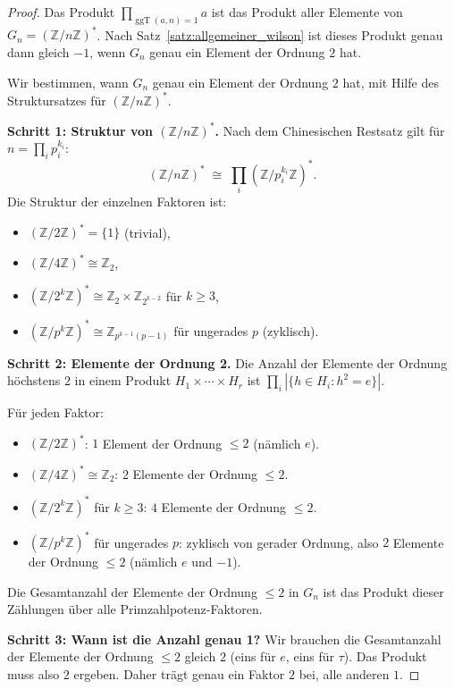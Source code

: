 \documentclass[12pt,a4paper]{amsart}
\theoremstyle{definition}
\newcommand{\Z}{\mathbb{Z}}
\DeclareMathOperator{\ggT}{ggT}
\begin{document}
\begin{proof}
  Das Produkt $\prod_{\ggT(a,n)=1} a$ ist das Produkt aller Elemente von
  $G_n = (\Z/n\Z)^*$. Nach Satz~\ref{satz:allgemeiner_wilson} ist dieses
  Produkt genau dann gleich $-1$, wenn $G_n$ genau ein Element der Ordnung $2$ hat.

  Wir bestimmen, wann $G_n$ genau ein Element der Ordnung $2$ hat, mit Hilfe des
  Struktursatzes für $(\Z/n\Z)^*$.

  \textbf{Schritt 1: Struktur von $(\Z/n\Z)^*$.}
  Nach dem Chinesischen Restsatz gilt für $n = \prod_{i} p_i^{k_i}$:
  \[
    (\Z/n\Z)^* \;\cong\; \prod_i (\Z/p_i^{k_i}\Z)^*.
  \]
  Die Struktur der einzelnen Faktoren ist:
  \begin{itemize}
    \item $(\Z/2\Z)^* = \{1\}$ (trivial),
    \item $(\Z/4\Z)^* \cong \Z_2$,
    \item $(\Z/2^k\Z)^* \cong \Z_2 \times \Z_{2^{k-2}}$ für $k \geq 3$,
    \item $(\Z/p^k\Z)^* \cong \Z_{p^{k-1}(p-1)}$ für ungerades $p$ (zyklisch).
  \end{itemize}

  \textbf{Schritt 2: Elemente der Ordnung 2.}
  Die Anzahl der Elemente der Ordnung höchstens $2$ in einem Produkt
  $H_1 \times \cdots \times H_r$ ist $\prod_i |\{h \in H_i : h^2 = e\}|$.

  Für jeden Faktor:
  \begin{itemize}
    \item $(\Z/2\Z)^*$: $1$ Element der Ordnung $\leq 2$ (nämlich $e$).
    \item $(\Z/4\Z)^* \cong \Z_2$: $2$ Elemente der Ordnung $\leq 2$.
    \item $(\Z/2^k\Z)^*$ für $k \geq 3$: $4$ Elemente der Ordnung $\leq 2$.
    \item $(\Z/p^k\Z)^*$ für ungerades $p$: zyklisch von gerader Ordnung,
      also $2$ Elemente der Ordnung $\leq 2$ (nämlich $e$ und $-1$).
  \end{itemize}

  Die Gesamtanzahl der Elemente der Ordnung $\leq 2$ in $G_n$ ist das Produkt
  dieser Zählungen über alle Primzahlpotenz-Faktoren.

  \textbf{Schritt 3: Wann ist die Anzahl genau 1?}
  Wir brauchen die Gesamtanzahl der Elemente der Ordnung $\leq 2$ gleich $2$
  (eins für $e$, eins für $\tau$). Das Produkt muss also $2$ ergeben.
  Daher trägt genau ein Faktor $2$ bei, alle anderen $1$.


\end{proof}
\end{document}
